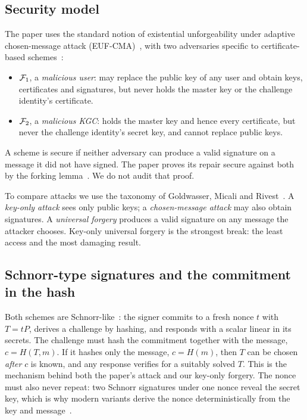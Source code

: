 \subsection{Security model}
The paper uses the standard notion of existential unforgeability under adaptive chosen-message attack
(EUF-CMA)~\cite{gmr1988}, with two adversaries specific to certificate-based schemes~\cite{qiao2023}:
\begin{itemize}
\item $\mathcal{F}_1$, a \emph{malicious user}: may replace the public key of any user and obtain keys,
      certificates and signatures, but never holds the master key or the challenge identity's certificate.
\item $\mathcal{F}_2$, a \emph{malicious KGC}: holds the master key and hence every certificate, but never the
      challenge identity's secret key, and cannot replace public keys.
\end{itemize}
A scheme is secure if neither adversary can produce a valid signature on a message it did not have
signed. The paper proves its repair secure against both by the forking lemma~\cite{pointcheval2000}. We do
not audit that proof.

To compare attacks we use the taxonomy of Goldwasser, Micali and Rivest~\cite{gmr1988}. A
\emph{key-only attack} sees only public keys; a \emph{chosen-message attack} may also obtain signatures.
A \emph{universal forgery} produces a valid signature on any message the attacker chooses. Key-only
universal forgery is the strongest break: the least access and the most damaging result.

\subsection{Schnorr-type signatures and the commitment in the hash}
Both schemes are Schnorr-like~\cite{schnorr1991}: the signer commits to a fresh nonce $t$ with $T=tP$,
derives a challenge by hashing, and responds with a scalar linear in its secrets. The challenge must hash
the commitment together with the message, $c=H(T,m)$. If it hashes only the message, $c=H(m)$, then $T$
can be chosen \emph{after} $c$ is known, and any response verifies for a suitably solved $T$. This is the
mechanism behind both the paper's attack and our key-only forgery. The nonce must also never repeat: two
Schnorr signatures under one nonce reveal the secret key, which is why modern variants derive the nonce
deterministically from the key and message~\cite{rfc6979,rfc8032}.


